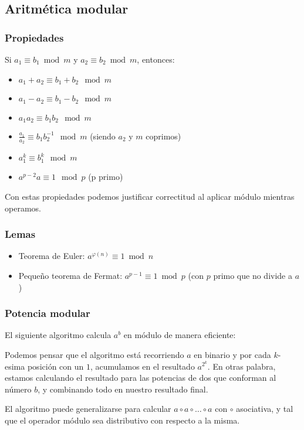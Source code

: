 
\subsection{Aritmética modular}



\subsubsection*{Propiedades}

Si $a_1 \equiv b_1 \bmod m$ y $a_2 \equiv b_2 \bmod m$, entonces: 
\begin{itemize}
	\item $a_1 + a_2 \equiv b_1 + b_2 \mod m$
	\item $a_1 - a_2 \equiv b_1 - b_2 \mod m$
	\item $a_1 a_2 \equiv b_1 b_2 \mod m$
	\item $\frac{a_1}{a_2} \equiv b_1 b_2^{-1} \mod m$ \quad (siendo $a_2$ y $m$ coprimos)
	\item $a_1^k \equiv b_1^k \mod m$
	\item $a^{p-2} a \equiv 1 \mod p $ \quad (p primo) \;
\end{itemize}

Con estas propiedades podemos justificar correctitud al aplicar módulo mientras operamos.

\subsubsection*{Lemas}

\begin{itemize}
	\item Teorema de Euler: $a^{\varphi{(n)}} \equiv 1 \bmod n$
	\item Pequeño teorema de Fermat: $a^{p-1} \equiv 1 \bmod p$ (con $p$ primo que no divide a $a$)
\end{itemize}

\subsubsection*{Potencia modular}

El siguiente algoritmo calcula $a^b$ en módulo de manera eficiente:


Podemos pensar que el algoritmo está recorriendo $a$ en binario y por cada $k$-esima posición con un $1$, acumulamos en el resultado $a^{2^k}$. En otras palabra, estamos calculando el resultado para las potencias de dos que conforman al número $b$, y combinando todo en nuestro resultado final.

El algoritmo puede generalizarse para calcular $a \circ a \circ \dots \circ a$ con $\circ$ asociativa, y tal que el operador módulo sea distributivo con respecto a la misma.


